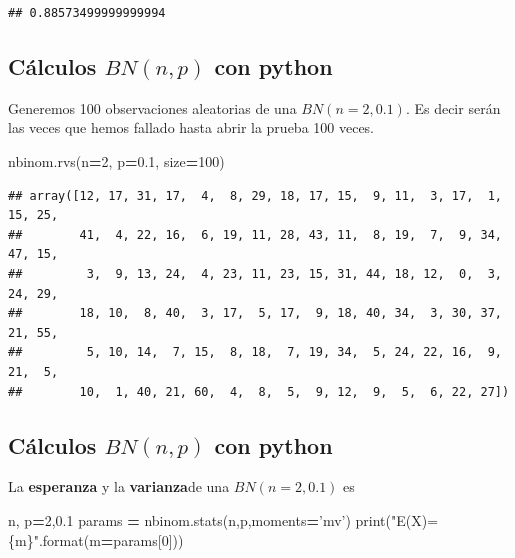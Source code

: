 \documentclass[]{book}
\newenvironment{Shaded}{\begin{snugshade}}{\end{snugshade}}
\newcommand{\BuiltInTok}[1]{#1}
\newcommand{\DecValTok}[1]{\textcolor[rgb]{0.00,0.00,0.81}{#1}}
\newcommand{\FloatTok}[1]{\textcolor[rgb]{0.00,0.00,0.81}{#1}}
\newcommand{\NormalTok}[1]{#1}
\newcommand{\OperatorTok}[1]{\textcolor[rgb]{0.81,0.36,0.00}{\textbf{#1}}}
\newcommand{\SpecialCharTok}[1]{\textcolor[rgb]{0.00,0.00,0.00}{#1}}
\newcommand{\StringTok}[1]{\textcolor[rgb]{0.31,0.60,0.02}{#1}}
\begin{document}
\begin{verbatim}
## 0.88573499999999994
\end{verbatim}

\hypertarget{cuxe1lculos-bnnp-con-python-1}{%
\subsection{\texorpdfstring{Cálculos \(BN(n,p)\) con python}{Cálculos BN(n,p) con python}}\label{cuxe1lculos-bnnp-con-python-1}}

Generemos 100 observaciones aleatorias de una \(BN(n=2,0.1)\). Es decir serán las veces que hemos fallado hasta abrir la prueba 100 veces.

\begin{Shaded}
\begin{Highlighting}[]
\NormalTok{nbinom.rvs(n}\OperatorTok{=}\DecValTok{2}\NormalTok{, p}\OperatorTok{=}\FloatTok{0.1}\NormalTok{, size}\OperatorTok{=}\DecValTok{100}\NormalTok{)}
\end{Highlighting}
\end{Shaded}

\begin{verbatim}
## array([12, 17, 31, 17,  4,  8, 29, 18, 17, 15,  9, 11,  3, 17,  1, 15, 25,
##        41,  4, 22, 16,  6, 19, 11, 28, 43, 11,  8, 19,  7,  9, 34, 47, 15,
##         3,  9, 13, 24,  4, 23, 11, 23, 15, 31, 44, 18, 12,  0,  3, 24, 29,
##        18, 10,  8, 40,  3, 17,  5, 17,  9, 18, 40, 34,  3, 30, 37, 21, 55,
##         5, 10, 14,  7, 15,  8, 18,  7, 19, 34,  5, 24, 22, 16,  9, 21,  5,
##        10,  1, 40, 21, 60,  4,  8,  5,  9, 12,  9,  5,  6, 22, 27])
\end{verbatim}

\hypertarget{cuxe1lculos-bnnp-con-python-2}{%
\subsection{\texorpdfstring{Cálculos \(BN(n,p)\) con python}{Cálculos BN(n,p) con python}}\label{cuxe1lculos-bnnp-con-python-2}}

La \textbf{esperanza} y la \textbf{varianza}de una \(BN(n=2,0.1)\) es

\begin{Shaded}
\begin{Highlighting}[]
\NormalTok{n, p}\OperatorTok{=}\DecValTok{2}\NormalTok{,}\FloatTok{0.1}
\NormalTok{params }\OperatorTok{=}\NormalTok{ nbinom.stats(n,p,moments}\OperatorTok{=}\StringTok{'mv'}\NormalTok{)}
\BuiltInTok{print}\NormalTok{(}\StringTok{"E(X)=}\SpecialCharTok{\{m\}}\StringTok{"}\NormalTok{.}\BuiltInTok{format}\NormalTok{(m}\OperatorTok{=}\NormalTok{params[}\DecValTok{0}\NormalTok{]))}
\end{Highlighting}
\end{Shaded}
\end{document}
